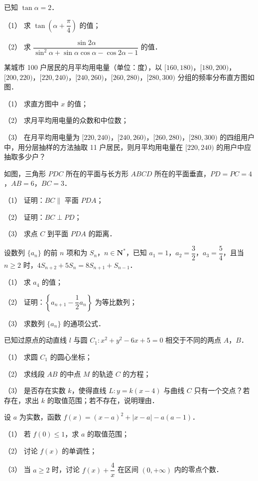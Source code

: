 \begin{question}
已知 \(\tan\alpha=2\)．

（1） 求 \(\tan\left(\alpha+\dfrac{\pi}{4}\right)\) 的值；

（2） 求 \(\dfrac{\sin 2\alpha}{\sin^2\alpha+\sin\alpha\cos\alpha-\cos 2\alpha-1}\) 的值．

\Needspace{0.4\textheight}
\end{question}
\begin{question}
某城市 100 户居民的月平均用电量（单位：度），以 \([160,180)\)，\([180,200)\)，\([200,220)\)，\([220,240)\)，\([240,260)\)，\([260,280)\)，\([280,300)\) 分组的频率分布直方图如图．
\nopagebreak[4]
\begin{center}\end{center}
\nopagebreak[4]
（1） 求直方图中 \(x\) 的值；

（2） 求月平均用电量的众数和中位数；

（3） 在月平均用电量为 \([220,240)\)，\([240,260)\)，\([260,280)\)，\([280,300)\) 的四组用户中，用分层抽样的方法抽取 11 户居民，则月平均用电量在 \([220,240)\) 的用户中应抽取多少户？

\Needspace{0.4\textheight}
\end{question}
\begin{question}
如图，三角形 \(PDC\) 所在的平面与长方形 \(ABCD\) 所在的平面垂直，\(PD=PC=4\)，\(AB=6\)，\(BC=3\)．
\nopagebreak[4]
\begin{center}\end{center}
\nopagebreak[4]
（1） 证明：\(BC\parallel\) 平面 \(PDA\)；

（2） 证明：\(BC\perp PD\)；

（3） 求点 \(C\) 到平面 \(PDA\) 的距离．

\end{question}
\begin{question}
设数列 \(\{a_n\}\) 的前 \(n\) 项和为 \(S_n\)，\(n\in\mathbf{N}^{*}\)，已知 \(a_1=1\)，\(a_2=\dfrac{3}{2}\)，\(a_3=\dfrac{5}{4}\)，且当 \(n\geqslant 2\) 时，\(4S_{n+2}+5S_n=8S_{n+1}+S_{n-1}\)．

（1） 求 \(a_4\) 的值；

（2） 证明：\(\left\{a_{n+1}-\dfrac{1}{2}a_n\right\}\) 为等比数列；

（3） 求数列 \(\{a_n\}\) 的通项公式．

\end{question}
\begin{question}
已知过原点的动直线 \(l\) 与圆 \(C_1: x^2+y^2-6x+5=0\) 相交于不同的两点 \(A\)，\(B\)．

（1） 求圆 \(C_1\) 的圆心坐标；

（2） 求线段 \(AB\) 的中点 \(M\) 的轨迹 \(C\) 的方程；

（3） 是否存在实数 \(k\)，使得直线 \(L: y=k(x-4)\) 与曲线 \(C\) 只有一个交点？若存在，求出 \(k\) 的取值范围；若不存在，说明理由．

\end{question}
\begin{question}
设 \(a\) 为实数，函数 \(f(x)=(x-a)^2+|x-a|-a(a-1)\)．

（1） 若 \(f(0)\leqslant 1\)，求 \(a\) 的取值范围；

（2） 讨论 \(f(x)\) 的单调性；

（3） 当 \(a\geqslant 2\) 时，讨论 \(f(x)+\dfrac{4}{x}\) 在区间 \((0,+\infty)\) 内的零点个数．

\end{question}